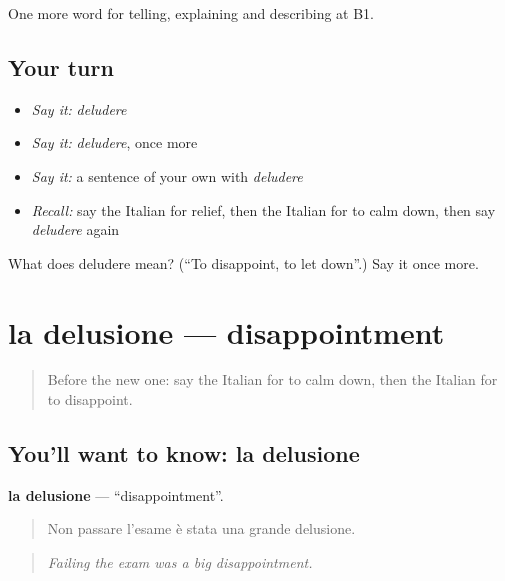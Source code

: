 \begin{grammarlens}[title={What you've built}]
One more word for telling, explaining and describing at B1.
\end{grammarlens}

\subsection*{Your turn}
\begin{itemize}
\raggedright
  \item \emph{Say it:} \emph{deludere}
  \item \emph{Say it:} \emph{deludere}, once more
  \item \emph{Say it:} a sentence of your own with \emph{deludere}
  \item \emph{Recall:} say the Italian for relief, then the Italian for to calm down, then say \emph{deludere} again
\end{itemize}

\begin{tcolorbox}[breakable,colback=teal!4,colframe=teal!35!black,title={Before you move on}]
What does deludere mean? (\textquotedblleft{}To disappoint, to let down\textquotedblright{}.) Say it once more.
\end{tcolorbox}
\section[la delusione]{la delusione — disappointment}

\label{lesson:IT-C476-delusione}



\begin{quote}
Before the new one: say the Italian for to calm down, then the Italian for to disappoint.
\end{quote}

\subsection*{You'll want to know: la delusione}
\textbf{la delusione} — \textquotedblleft{}disappointment\textquotedblright{}.

\begin{quote}
Non passare l'esame è stata una grande delusione.
\end{quote}

\begin{quote}
\emph{Failing the exam was a big disappointment.}
\end{quote}

